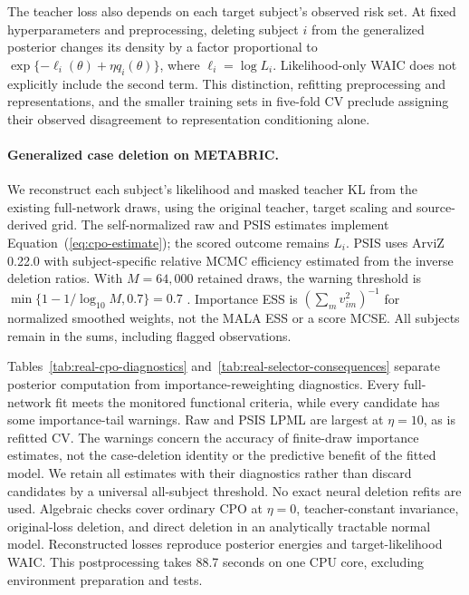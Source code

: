 \documentclass{article} %
\renewcommand{\eqref}[1]{\textup{(\ref{#1})}}
\begin{document}
The teacher loss also depends on each target subject's observed risk set. At fixed hyperparameters and preprocessing, deleting subject $i$ from the generalized posterior changes its density by a factor proportional to $\exp\{-\ell_i(\theta)+\eta q_i(\theta)\}$, where $\ell_i=\log L_i$. Likelihood-only WAIC does not explicitly include the second term. This distinction, refitting preprocessing and representations, and the smaller training sets in five-fold CV preclude assigning their observed disagreement to representation conditioning alone.

\paragraph{Generalized case deletion on METABRIC.}
We reconstruct each subject's likelihood and masked teacher KL from the existing full-network draws, using the original teacher, target scaling and source-derived grid. The self-normalized raw and PSIS estimates implement Equation~\eqref{eq:cpo-estimate}; the scored outcome remains $L_i$. PSIS uses ArviZ 0.22.0 with subject-specific relative MCMC efficiency estimated from the inverse deletion ratios. With $M=64{,}000$ retained draws, the warning threshold is $\min\{1-1/\log_{10}M,0.7\}=0.7$ \citep{vehtari2024}. Importance ESS is $(\sum_m v_{im}^2)^{-1}$ for normalized smoothed weights, not the MALA ESS or a score MCSE. All subjects remain in the sums, including flagged observations.

Tables~\ref{tab:real-cpo-diagnostics} and~\ref{tab:real-selector-consequences} separate posterior computation from importance-reweighting diagnostics. Every full-network fit meets the monitored functional criteria, while every candidate has some importance-tail warnings. Raw and PSIS LPML are largest at $\eta=10$, as is refitted CV. The warnings concern the accuracy of finite-draw importance estimates, not the case-deletion identity or the predictive benefit of the fitted model. We retain all estimates with their diagnostics rather than discard candidates by a universal all-subject threshold. No exact neural deletion refits are used. Algebraic checks cover ordinary CPO at $\eta=0$, teacher-constant invariance, original-loss deletion, and direct deletion in an analytically tractable normal model. Reconstructed losses reproduce posterior energies and target-likelihood WAIC. This postprocessing takes 88.7 seconds on one CPU core, excluding environment preparation and tests.
\end{document}

